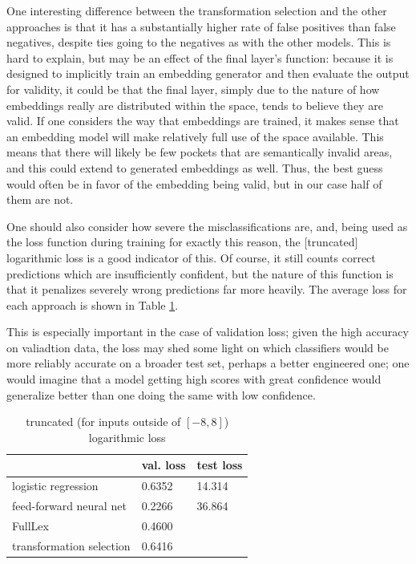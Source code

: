 \documentclass[a4paper, 12pt]{scrartcl}
\begin{document}
One interesting difference between the transformation selection and the other approaches is that it has a substantially higher rate of false positives than false negatives, despite ties going to the negatives as with the other models. This is hard to explain, but may be an effect of the final layer's function: because it is designed to implicitly train an embedding generator and then evaluate the output for validity, it could be that the final layer, simply due to the nature of how embeddings really are distributed within the space, tends to believe they are valid. If one considers the way that embeddings are trained, it makes sense that an embedding model will make relatively full use of the space available. This means that there will likely be few pockets that are semantically invalid areas, and this could extend to generated embeddings as well. Thus, the best guess would often be in favor of the embedding being valid, but in our case half of them are not.

One should also consider how severe the misclassifications are, and, being used as the loss function during training for exactly this reason, the [truncated] logarithmic loss is a good indicator of this. Of course, it still counts correct predictions which are insufficiently confident, but the nature of this function is that it penalizes severely wrong predictions far more heavily. The average loss for each approach is shown in Table \ref{loss-an}.

This is especially important in the case of validation loss; given the high accuracy on valiadtion data, the loss may shed some light on which classifiers would be more reliably accurate on a broader test set, perhaps a better engineered one; one would imagine that a model getting high scores with great confidence would generalize better than one doing the same with low confidence.

\begin{table}[]
	\centering
	\begin{tabular}{l|l|l}
		                         & val. loss & test loss \\ \hline
		logistic regression      & 0.6352    & 14.314    \\
		feed-forward neural net  & 0.2266    & 36.864    \\
		FullLex                  & 0.4600    &           \\
		transformation selection & 0.6416    &          
	\end{tabular}
	\caption{truncated (for inputs outside of $[-8, 8]$) logarithmic loss}
	\label{loss-an}
\end{table}
\end{document}
